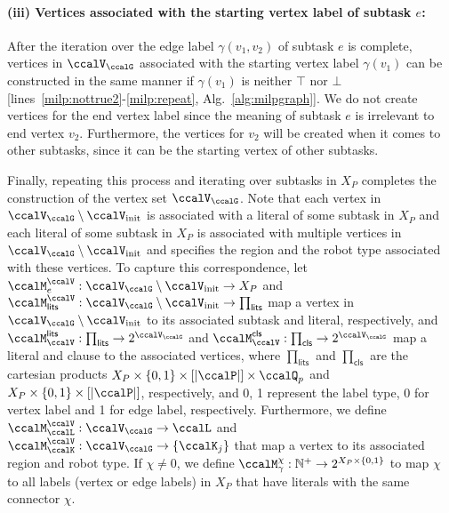 \documentclass[Afour,sageh,times]{sagej}
\begin{document}
\paragraph{(iii) Vertices associated with the starting vertex label of subtask $e$:} After the iteration over the edge label $\gamma(v_1, v_2)$ of subtask $e$ is complete, vertices in $\ccalV_\ccalG$ associated with the starting  vertex label $\gamma(v_1)$ can be constructed in the same manner if $\gamma(v_1)$ is neither $\top$ nor $\bot$ [lines~\ref{milp:nottrue2}-\ref{milp:repeat}, Alg.~\ref{alg:milpgraph}]. We do not create vertices for the end vertex label since the meaning of subtask $e$ is irrelevant to end vertex $v_2$. Furthermore, the vertices for $v_2$ will be created when it comes to other subtasks, since it can be the starting vertex of other subtasks.

Finally, repeating this process and iterating over subtasks in $X_{P}$ completes the construction of the vertex set $\ccalV_\ccalG$. Note that each vertex in $\ccalV_\ccalG\setminus \ccalV_{\text{init}}$ is associated with a literal of some subtask in $X_P$ and each literal of some subtask in $X_P$ is associated with multiple vertices in $\ccalV_\ccalG\setminus \ccalV_{\text{init}}$ and specifies the region and the robot type associated with these vertices.
To capture this correspondence, let $\ccalM^\ccalV_{e} : \ccalV_{\ccalG}\setminus \ccalV_{\text{init}} \to  X_{P} $ and $\ccalM^\ccalV_{\mathsf{lits}}  : \ccalV_\ccalG\setminus \ccalV_\text{init}  \to  \prod_{\mathsf{lits}} $  map a vertex in $\ccalV_\ccalG \setminus \ccalV_{\text{init}}$ to its associated subtask and literal, respectively, and $\ccalM^\mathsf{lits}_{\ccalV}:   \prod_{\mathsf{lits}}  \to  2^{\ccalV_\ccalG}$ and $\ccalM^\mathsf{cls}_{\ccalV} :  \prod_{\mathsf{cls}} \to  2^{\ccalV_\ccalG}$ map a literal and clause to the associated vertices, where $\prod_{\mathsf{lits}}$ and $\prod_{\mathsf{cls}}$ are the cartesian products $ X_{P} \times\{0, 1\} \times [|\ccalP|]  \times \ccalQ_p$ and $X_{P}\times \{0, 1\} \times[|\ccalP|]$, respectively, and 0, 1 represent the label type, 0 for vertex label and 1 for edge label, respectively. Furthermore, we define $\ccalM^{\ccalV}_\ccalL :  \ccalV_\ccalG  \to  \ccalL$ and $ \ccalM^{\ccalV}_\ccalK :  {\ccalV_\ccalG}  \to  \{\ccalK_j\}$ that map a vertex to its associated  region and robot type. {If $\chi\not=0$, we define  $\ccalM_{\gamma}^\chi: \mathbb{N}^+ \to 2^{X_{P}\times \{0,1\}}$ to map $\chi$ to all labels (vertex or edge labels) in $X_P$ that have literals with the same connector $\chi$}.
\end{document}
